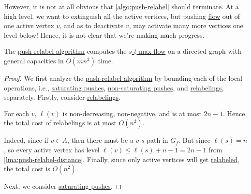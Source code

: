 However, it is not at all obvious that \autoref{algo:push-relabel} should terminate. At a high level, we want to extinguish all the active vertices, but pushing \hyperref[def:flow]{flow} out of one active vertex \(v\), and as to deactivate \(v\), may activate many more vertices one level below! Hence, it is not clear that we're making much progress.

\begin{theorem}\label{thm:push-relabel-naive}
	The \hyperref[algo:push-relabel]{push-relabel algorithm} computes the \hyperref[prb:s-t-max-flow]{\(s\)-\(t\) max-flow} on a directed graph with general capacities in \(O(mn^2)\) time.
\end{theorem}
\begin{proof}
	We first analyze the \hyperref[algo:push-relabel]{push-relabel algorithm} by bounding each of the local operations, i.e., \hyperref[algo:push-relabel-push-saturating]{saturating pushes}, \hyperref[algo:push-relabel-push-non-saturating]{non-saturating pushes}, and \hyperref[algo:push-relabel-relabel]{relabelings}, separately. Firstly, consider \hyperref[algo:push-relabel-relabel]{relabelings}.

	\begin{claim}
		For each \(v\), \(\ell (v)\) is non-decreasing, non-negative, and is at most \(2n - 1\). Hence, the total cost of \hyperref[algo:push-relabel-relabel]{relabelings} is at most \(O(n^2)\).
	\end{claim}
	\begin{explanation}
		Indeed, since if \(v \in A\), then there must be a \(v\)-\(s\) path in \(G_f\). But since \(\ell (s) = n\), so every active vertex has level \(\ell (v) \leq \ell (s) + n - 1 = 2n - 1\) from \autoref{lma:push-relabel-distance}. Finally, since only active vertices will get \hyperref[algo:push-relabel-relabel]{relabeled}, the total cost is \(O(n^2)\).
	\end{explanation}

	Next, we consider \hyperref[algo:push-relabel-push-saturating]{saturating pushes}.


\end{proof}
